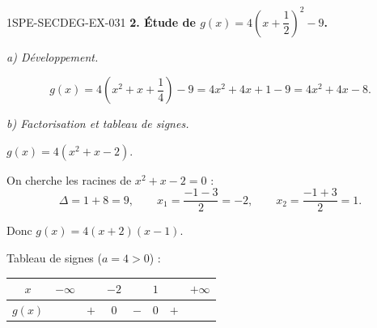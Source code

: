 \begin{corrige}{1SPE-SECDEG-EX-031}
\medskip
\textbf{2. Étude de $g(x) = 4\!\left(x + \dfrac{1}{2}\right)^2 - 9$.}

\textit{a) Développement.}


\[g(x) = 4\!\left(x^2 + x + \frac{1}{4}\right) - 9 = 4x^2 + 4x + 1 - 9 = 4x^2 + 4x - 8.\]

\textit{b) Factorisation et tableau de signes.}


$g(x) = 4(x^2 + x - 2)$.

On cherche les racines de $x^2 + x - 2 = 0$ :
\[\Delta = 1 + 8 = 9, \qquad x_1 = \frac{-1 - 3}{2} = -2, \qquad x_2 = \frac{-1 + 3}{2} = 1.\]

Donc $g(x) = 4(x + 2)(x - 1)$.

Tableau de signes ($a = 4 > 0$) :

\medskip
\begin{center}
\begin{tabular}{|c|ccccccc|}
\hline
$x$ & $-\infty$ & & $-2$ & & $1$ & & $+\infty$ \\
\hline
$g(x)$ & & $+$ & $0$ & $-$ & $0$ & $+$ & \\
\hline
\end{tabular}
\end{center}

\end{corrige}
